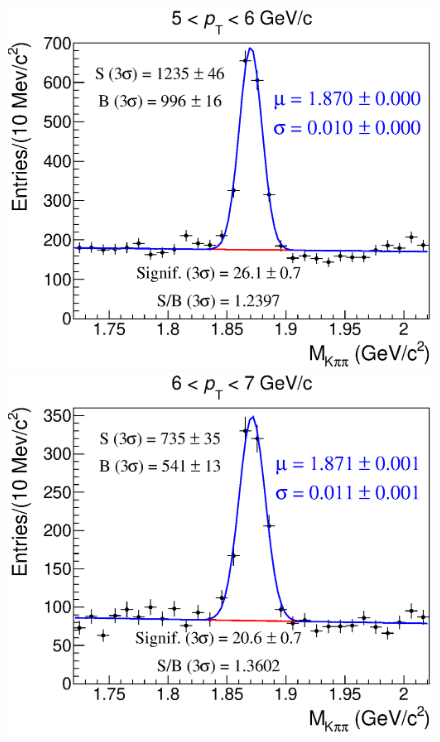 \documentclass[b5paper,10pt,twoside,oldstyle,classica]{toptesi}
\begin{document}
\begin{figure}[h]
\begin{center}
{\includegraphics[scale = 0.25]{MassFits_cutset1_4.eps}}
\hspace{0cm}
{\includegraphics[scale = 0.25]{MassFits_cutset1_5.eps}}
\vspace{0cm}

\end{center}
\end{figure}
\end{document}
